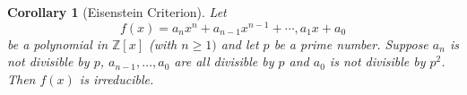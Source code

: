 \documentclass[11pt,a4paper]{report}
\theoremstyle{plain}
\newtheorem{corollary}[subsection]{Corollary}
\theoremstyle{definition}
\theoremstyle{definition}
\newcommand{\ZZ}{\mathbb{Z}}
\begin{document}
	
	
	
	
	
	
	
	\begin{corollary}[Eisenstein Criterion]\label{Eis crit}
		Let \[f(x)=a_n x^n+a_{n-1}x^{n-1}+ \cdots, a_1x+a_0\] be a polynomial in $\ZZ[x]$ (with $n \geq 1)$ and let $p$ be a prime number. Suppose $a_n$ is not divisible by $p$, $a_{n-1},\dots,a_0$ are all divisible by $p$ and $a_0$ is not divisible by $p^2$. Then $f(x)$ is irreducible.
		
		
	\end{corollary}
	
\end{document}
